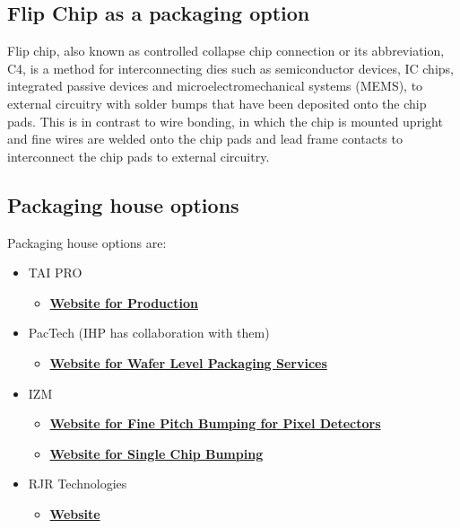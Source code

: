 \subsection{Flip Chip as a packaging option}

Flip chip, also known as controlled collapse chip connection or its abbreviation, C4, is a method for interconnecting dies such as semiconductor devices, IC chips, integrated passive devices and microelectromechanical systems (MEMS), to external circuitry with solder bumps that have been deposited onto the chip pads. This is in contrast to wire bonding, in which the chip is mounted upright and fine wires are welded onto the chip pads and lead frame contacts to interconnect the chip pads to external circuitry.


\subsection{Packaging house options}

Packaging house options are:

\begin{itemize}
	\item TAI PRO
	\begin{itemize}
		\item \href{https://www.taipro.be/production}{\textbf{Website for Production}}
	\end{itemize}
	\item PacTech (IHP has collaboration with them)
	\begin{itemize}
		\item \href{https://pactech.com/wafer-level-packaging-services/}{\textbf{Website for Wafer Level Packaging Services}}
	\end{itemize}
	\item IZM
	\begin{itemize}
		\item \href{https://www.izm.fraunhofer.de/en/abteilungen/wafer-level-system-integration/leistungsangebot/fine-pitch-bumping-for-pixel-detectors.html}{\textbf{Website for Fine Pitch Bumping for Pixel Detectors}}
		\item \href{https://www.izm.fraunhofer.de/en/abteilungen/wafer-level-system-integration/leistungsangebot/single_chip_bumping.html}{\textbf{Website for Single Chip Bumping}}
	\end{itemize}
	\item RJR Technologies
	\begin{itemize}
		\item \href{https://www.rjrtechnologies.com/}{\textbf{Website}}
	\end{itemize}
\end{itemize}

